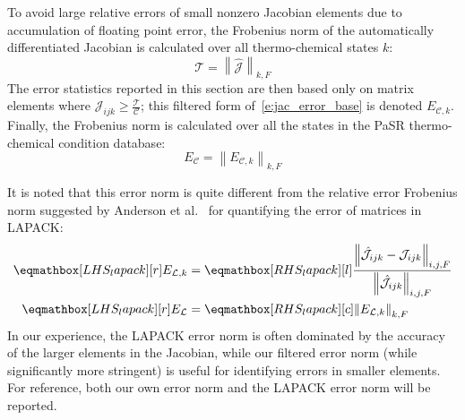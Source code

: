 \documentclass[12pt,number,sort&compress,preprint]{elsarticle}
\begin{document}
To avoid large relative errors of small nonzero Jacobian elements due to accumulation of floating point error, the Frobenius norm of the automatically differentiated Jacobian is calculated over all thermo-chemical states $k$:
\begin{equation}
 \label{e:thresh}
 \mathcal{T} = \left\lVert \mathcal{\hat{J}} \right\rVert_{k, F}
\end{equation}
The error statistics reported in this section are then based only on matrix elements where $\mathcal{J}_{ijk} \ge \frac{\mathcal{T}}{\mathcal{C}}$; this filtered form of~\cref{e:jac_error_base} is denoted $E_{\mathcal{C},k}$.
Finally, the Frobenius norm is calculated over all the states in the PaSR thermo-chemical condition database:
\begin{equation}
 \label{e:thresholded_error}
 E_{\mathcal{C}} = \left\lVert E_{\mathcal{C},k} \right\rVert_{k, F}
\end{equation}

It is noted that this error norm is quite different from the relative error Frobenius norm suggested by Anderson et al.~\cite{Anderson:1999aa} for quantifying the error of matrices in LAPACK:
\begin{align}
 \label{e:error_lapack}
 \lhs{lapack}{E_{\mathcal{L}, k}} &=  \rhs{lapack}{\frac{\left\lVert \hat{\mathcal{J}}_{ijk} - \mathcal{J}_{ijk} \right\rVert_{i,j,F}}{\left\lVert \hat{\mathcal{J}}_{ijk} \right\rVert_{i,j,F}}} \nonumber \\
 \lhs{lapack}{E_{\mathcal{L}}} &= \rhs{lapack}{\left\lVert  E_{\mathcal{L}, k} \right\rVert_{k, F}}[c]
\end{align}
In our experience, the LAPACK error norm is often dominated by the accuracy of the larger elements in the Jacobian, while our filtered error norm (while significantly more stringent) is useful for identifying errors in smaller elements.
For reference, both our own error norm and the LAPACK error norm will be reported.
\end{document}
